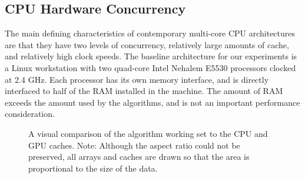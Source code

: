 \subsection{CPU Hardware Concurrency}
\label{sec:CPU-concurrency}
The main defining characteristics of contemporary multi-core CPU architectures
are that they have two levels of concurrency, relatively large amounts of
cache, and relatively high clock speeds. The baseline architecture for our experiments 
is a Linux workstation with two
quad-core Intel Nehalem E5530 processors clocked at 2.4 GHz.  Each processor
has its own memory interface, and is directly interfaced to half of the RAM
installed in the machine.  The amount of RAM exceeds the amount used
by the algorithms, and is not an important performance consideration.  

\begin{figure}
\centering
{}
\label{fig:caches}
\caption{A visual comparison of the algorithm working set to the CPU and GPU
caches.  Note: Although the aspect ratio could not be preserved, all arrays and
caches are drawn so that the area is proportional to the size of the data. } 
\end{figure}

